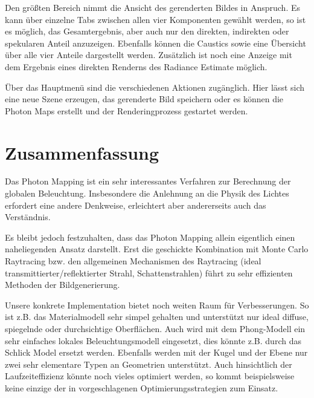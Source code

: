 \documentclass[a4paper,twocolumn,abstracton]{scrartcl}
\begin{document}
Den größten Bereich nimmt die Ansicht des gerenderten Bildes in Anspruch. Es kann über einzelne Tabs zwischen allen vier Komponenten gewählt werden, so ist es möglich, das Gesamtergebnis, aber auch nur den direkten, indirekten oder spekularen Anteil anzuzeigen. Ebenfalls können die Caustics sowie eine Übersicht über alle vier Anteile dargestellt werden. Zusätzlich ist noch eine Anzeige mit dem Ergebnis eines direkten Renderns des Radiance Estimate möglich.

Über das Hauptmenü sind die verschiedenen Aktionen zugänglich. Hier lässt sich eine neue Szene erzeugen, das gerenderte Bild speichern oder es können die Photon Maps erstellt und der Renderingprozess gestartet werden.

\section{Zusammenfassung}
Das Photon Mapping ist ein sehr interessantes Verfahren zur Berechnung der globalen Beleuchtung. Insbesondere die Anlehnung an die Physik des Lichtes erfordert eine andere Denkweise, erleichtert aber andererseits auch das Verständnis. 

Es bleibt jedoch festzuhalten, dass das Photon Mapping allein eigentlich einen naheliegenden Ansatz darstellt. Erst die geschickte Kombination mit Monte Carlo Raytracing bzw. den allgemeinen Mechanismen des Raytracing (ideal transmittierter/reflektierter Strahl, Schattenstrahlen) führt zu sehr effizienten Methoden der Bildgenerierung.

Unsere konkrete Implementation bietet noch weiten Raum für Verbesserungen. So ist z.B. das Materialmodell sehr simpel gehalten und unterstützt nur ideal diffuse, spiegelnde oder durchsichtige Oberflächen. Auch wird mit dem Phong-Modell ein sehr einfaches lokales Beleuchtungsmodell eingesetzt, dies könnte z.B. durch das Schlick Model \citep{Jensen2001} ersetzt werden. Ebenfalls werden mit der Kugel und der Ebene nur zwei sehr elementare Typen an Geometrien unterstützt. Auch hinsichtlich der Laufzeiteffizienz könnte noch vieles optimiert werden, so kommt beispielsweise keine einzige der in \citep{Jensen2001} vorgeschlagenen Optimierungsstrategien zum Einsatz.



\end{document}
